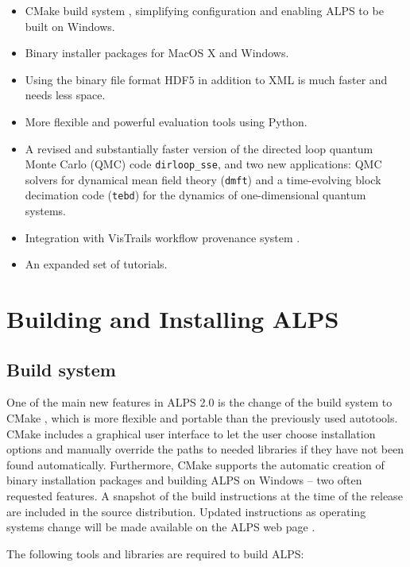 \documentclass[12pt]{iopart}
\begin{document}
 
 \begin{itemize}
\item CMake build system \cite{cmake}, simplifying configuration and enabling ALPS to be built on  Windows.
\item Binary installer packages for MacOS X and Windows.
\item Using the binary file format HDF5 \cite{hdf5} in addition to XML is much faster and needs less space.
\item More flexible and powerful evaluation tools using Python.
\item A revised and substantially faster version of the directed loop quantum Monte Carlo (QMC) code {\tt dirloop\_sse}, and two new applications: QMC solvers for dynamical 
mean field theory ({\tt dmft}) and a time-evolving block decimation code ({\tt tebd}) for the dynamics of one-dimensional quantum systems.
\item Integration with VisTrails workflow provenance system \cite{vistrails}.
\item An expanded set of tutorials.
 \end{itemize}
 
 
\section{Building and Installing ALPS}
\subsection{Build system}
One of the main new features in ALPS 2.0 is the change of the build system to CMake \cite{cmake}, which is more flexible and portable than the previously used autotools. CMake includes a graphical user interface to let the user choose installation options and manually override the paths to needed libraries if they have not been found automatically.  Furthermore, CMake supports the automatic creation of binary installation packages and building ALPS on Windows -- two often requested features. A snapshot of the build instructions at the time of the release are included in the source distribution. Updated instructions as operating systems change will be made available on the ALPS web page \cite{alps}.

The following tools and libraries are required to build ALPS:
\end{document}
